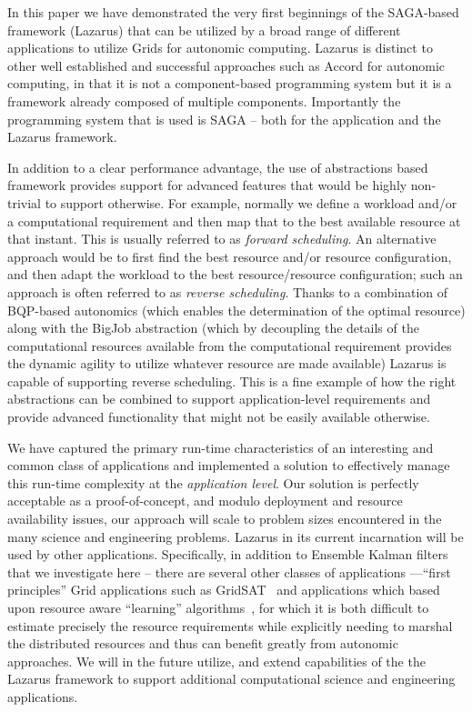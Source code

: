 \documentclass{sig-alternate}
\begin{document}
In this paper we have demonstrated the very first beginnings of the
SAGA-based framework (Lazarus) that can be utilized by a broad range
of different applications to utilize Grids for autonomic computing.
Lazarus is distinct to other well established and successful
approaches such as Accord for autonomic computing, in that it is not a
component-based programming system but it is a framework already
composed of multiple components. Importantly the programming system
that is used is SAGA -- both for the application and the Lazarus
framework.

In addition to a clear performance advantage, the use of abstractions
based framework provides support for advanced features that would be
highly non-trivial to support otherwise.  For example, normally we
define a workload and/or a computational requirement and then map that
to the best available resource at that instant.  This is usually
referred to as {\it forward scheduling}.  An alternative approach
would be to first find the best resource and/or resource
configuration, and then adapt the workload to the best
resource/resource configuration; such an approach is often referred to
as {\it reverse scheduling}.  Thanks to a combination of BQP-based
autonomics (which enables the determination of the optimal resource)
along with the BigJob abstraction (which by decoupling the details of
the computational resources available from the computational
requirement provides the dynamic agility to utilize whatever resource
are made available) Lazarus is capable of supporting reverse
scheduling. This is a fine example of how the right abstractions can
be combined to support application-level requirements and provide
advanced functionality that might not be easily available otherwise.

We have captured the primary run-time characteristics of an
interesting and common class of applications and implemented a
solution to effectively manage this run-time complexity at the {\it
  application level}.  Our solution is perfectly acceptable as a
proof-of-concept, and modulo deployment and resource availability
issues, our approach will scale to problem sizes encountered in the
many science and engineering problems.  Lazarus in its current
incarnation will be used by other applications. Specifically, in
addition to Ensemble Kalman filters %
that we investigate here -- there are several other classes of
applications ---``first principles'' Grid applications such as
GridSAT~\cite{gridsat03} and applications which based upon resource
aware ``learning'' algorithms~\cite{ majority_voting}, for which it is
both difficult to estimate precisely the resource requirements while
explicitly needing to marshal the distributed resources and thus can
benefit greatly from autonomic approaches. We will in the future
utilize, and extend capabilities of the the Lazarus framework to
support additional computational science and engineering applications.
\end{document}
